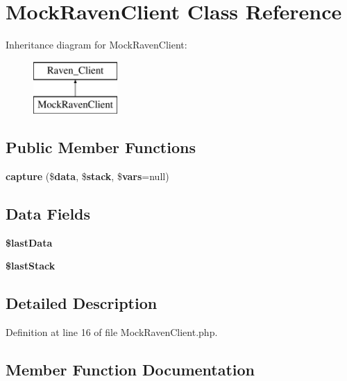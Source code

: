 \section{Mock\+Raven\+Client Class Reference}
\label{class_monolog_1_1_handler_1_1_mock_raven_client}
Inheritance diagram for Mock\+Raven\+Client\+:\begin{figure}[H]
\begin{center}
\leavevmode
\includegraphics[height=2.000000cm]{class_monolog_1_1_handler_1_1_mock_raven_client}
\end{center}
\end{figure}
\subsection*{Public Member Functions}
\begin{DoxyCompactItemize}
\item 
{\bf capture} (\${\bf data}, \${\bf stack}, \${\bf vars}=null)
\end{DoxyCompactItemize}
\subsection*{Data Fields}
\begin{DoxyCompactItemize}
\item 
{\bf \$last\+Data}
\item 
{\bf \$last\+Stack}
\end{DoxyCompactItemize}


\subsection{Detailed Description}


Definition at line 16 of file Mock\+Raven\+Client.\+php.



\subsection{Member Function Documentation}
